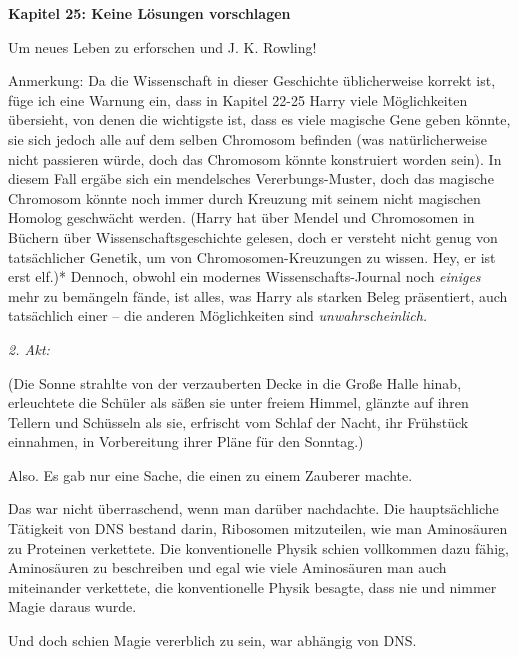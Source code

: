 

\hypertarget{keine-luxf6sungen-vorschlagen}{%

\textbf{Kapitel 25: Keine Lösungen vorschlagen}

Um neues Leben zu erforschen und J. K. Rowling!

Anmerkung: Da die Wissenschaft in dieser Geschichte üblicherweise korrekt ist, füge ich eine Warnung ein, dass in Kapitel 22-25 Harry viele Möglichkeiten übersieht, von denen die wichtigste ist, dass es viele magische Gene geben könnte, sie sich jedoch alle auf dem selben Chromosom befinden (was natürlicherweise nicht passieren würde, doch das Chromosom könnte konstruiert worden sein). In diesem Fall ergäbe sich ein mendelsches Vererbungs-Muster, doch das magische Chromosom könnte noch immer durch Kreuzung mit seinem nicht magischen Homolog geschwächt werden. (Harry hat über Mendel und Chromosomen in Büchern über Wissenschaftsgeschichte gelesen, doch er versteht nicht genug von tatsächlicher Genetik, um von Chromosomen-Kreuzungen zu wissen. Hey, er ist erst elf.)* Dennoch, obwohl ein modernes Wissenschafts-Journal noch \emph{einiges} mehr zu bemängeln fände, ist alles, was Harry als starken Beleg präsentiert, auch tatsächlich einer -- die anderen Möglichkeiten sind \emph{unwahrscheinlich.}

\later

\emph{2. Akt:}

(Die Sonne strahlte von der verzauberten Decke in die Große Halle hinab, erleuchtete die Schüler als säßen sie unter freiem Himmel, glänzte auf ihren Tellern und Schüsseln als sie, erfrischt vom Schlaf der Nacht, ihr Frühstück einnahmen, in Vorbereitung ihrer Pläne für den Sonntag.)

Also. Es gab nur eine Sache, die einen zu einem Zauberer machte.

Das war nicht überraschend, wenn man darüber nachdachte. Die hauptsächliche Tätigkeit von DNS bestand darin, Ribosomen mitzuteilen, wie man Aminosäuren zu Proteinen verkettete. Die konventionelle Physik schien vollkommen dazu fähig, Aminosäuren zu beschreiben und egal wie viele Aminosäuren man auch miteinander verkettete, die konventionelle Physik besagte, dass nie und nimmer Magie daraus wurde.

Und doch schien Magie vererblich zu sein, war abhängig von DNS.

}
